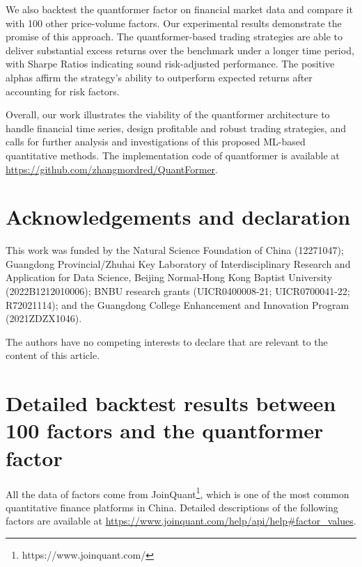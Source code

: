 \documentclass[preprint,12pt]{elsarticle}
\begin{document}
We also backtest the quantformer factor on financial market data and compare it with 100 other price-volume factors. Our experimental results demonstrate the promise of this approach. The quantformer-based trading strategies are able to deliver substantial excess returns over the benchmark under a longer time period, with Sharpe Ratios indicating sound risk-adjusted performance. The positive alphas affirm the strategy's ability to outperform expected returns after accounting for risk factors. 

Overall, our work illustrates the viability of the quantformer architecture to handle financial time series, design profitable and robust trading strategies, and calls for further analysis and investigations of this proposed ML-based quantitative methods. The implementation code of quantformer is available at \url{https://github.com/zhangmordred/QuantFormer}.


\section{Acknowledgements and declaration}
This work was funded by the Natural Science Foundation of China (12271047); Guangdong Provincial/Zhuhai Key Laboratory of Interdisciplinary Research and Application for Data Science, Beijing Normal-Hong Kong Baptist University (2022B1212010006); BNBU research grants (UICR0400008-21; UICR0700041-22; R72021114); and the Guangdong College Enhancement and Innovation Program (2021ZDZX1046).

The authors have no competing interests to declare that are relevant to the content of this article.





% 





\appendix
\section{Detailed backtest results between 100 factors and the quantformer factor}\label{A1}
All the data of factors come from JoinQuant\footnote{https://www.joinquant.com/}, which is one of the most common quantitative finance platforms in China. Detailed descriptions of the following factors are available at \url{https://www.joinquant.com/help/api/help#factor_values}. 
\end{document}
